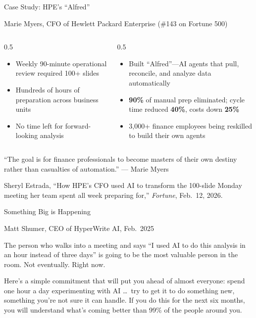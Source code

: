 \documentclass[aspectratio=169]{beamer}
\begin{document}
\begin{frame}[shrink=5]{Case Study: HPE's ``Alfred''}
\centerline{Marie Myers, CFO of Hewlett Packard Enterprise (\#143 on Fortune 500)}
\vspace{0.2cm}
\begin{columns}[T]
\begin{column}{0.5\textwidth}
\begin{shadedbox}[title=\textbf{The Problem}]
\begin{itemize}\small
  \item Weekly 90-minute operational review required 100+ slides
  \item Hundreds of hours of preparation across business units
  \item No time left for forward-looking analysis
\end{itemize}
\end{shadedbox}
\end{column}
\begin{column}{0.5\textwidth}
\begin{shadedbox}[title=\textbf{The AI Solution}]
\begin{itemize}\small
  \item Built ``Alfred''---AI agents that pull, reconcile, and analyze data automatically
  \item \textbf{90\%} of manual prep eliminated; cycle time reduced \textbf{40\%}, costs down \textbf{25\%}
  \item 3,000+ finance employees being reskilled to build their own agents
\end{itemize}
\end{shadedbox}
\end{column}
\end{columns}
\vspace{0.2cm}
\centering
``The goal is for finance professionals to become \alert{masters of their own destiny} rather than casualties of automation.'' --- Marie Myers

\vspace{0.1cm}
{\scriptsize Sheryl Estrada, ``How HPE's CFO used AI to transform the 100-slide Monday meeting her team spent all week preparing for,'' \textit{Fortune}, Feb.\ 12, 2026.}
\end{frame}

\begin{frame}{Something Big is Happening}
\centerline{Matt Shumer, CEO of HyperWrite AI, Feb.\ 2025}

The person who walks into a meeting and says ``I used AI to do this analysis in an hour instead of three days'' is going to be the most valuable person in the room. Not eventually. Right now.

\bigskip

Here's a simple commitment that will put you ahead of almost everyone: spend one hour a day experimenting with AI \ldots\ try to get it to do something new, something you're not sure it can handle. If you do this for the next six months, you will understand what's coming better than 99\% of the people around you.
\end{frame}
\end{document}
